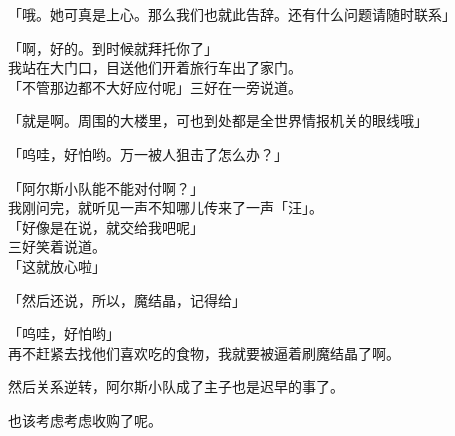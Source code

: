 「哦。她可真是上心。那么我们也就此告辞。还有什么问题请随时联系」

「啊，好的。到时候就拜托你了」\\

我站在大门口，目送他们开着旅行车出了家门。\\

「不管那边都不大好应付呢」三好在一旁说道。

「就是啊。周围的大楼里，可也到处都是全世界情报机关的眼线哦」

「呜哇，好怕哟。万一被人狙击了怎么办？」

「阿尔斯小队能不能对付啊？」\\

我刚问完，就听见一声不知哪儿传来了一声「汪」。\\

「好像是在说，就交给我吧呢」\\

三好笑着说道。\\

「这就放心啦」

「然后还说，所以，魔结晶，记得给」

「呜哇，好怕哟」\\

再不赶紧去找他们喜欢吃的食物，我就要被逼着刷魔结晶了啊。

然后关系逆转，阿尔斯小队成了主子也是迟早的事了。

也该考虑考虑收购了呢。\\

